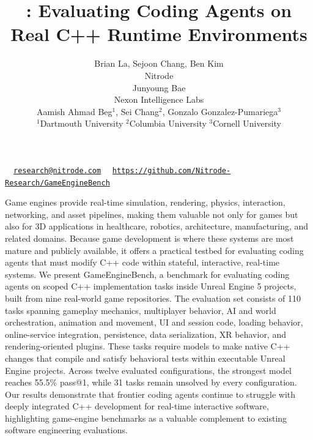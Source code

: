 \documentclass[11pt]{article}
\title{\benchmarkname: Evaluating Coding Agents on Real C++ Runtime Environments}
\author{
  Brian La, Sejoon Chang, Ben Kim \\
  {\small Nitrode}\\[1em]
  Junyoung Bae \\
  {\small Nexon Intelligence Labs}\\[1em]
  Aamish Ahmad Beg$^{1}$, Sei Chang$^{2}$, Gonzalo Gonzalez-Pumariega$^{3}$\\
  {\small $^{1}$Dartmouth University $^{2}$Columbia University $^{3}$Cornell University}
}
\date{}
\newcommand{\benchmarkname}{GameEngineBench\xspace}
\renewcommand{\abstractname}{Abstract}
\renewenvironment{abstract}
  {\par\noindent{\Large\bfseries\abstractname}\par\vspace{0.4em}\noindent}
  {\par\vspace{0.6em}}
\begin{document}
\maketitle
\vspace*{-2em}
\renewcommand{\thefootnote}{\fnsymbol{footnote}}
\renewcommand{\thefootnote}{\arabic{footnote}}

\begin{flushleft}
\small
{}~~\href{mailto:research@nitrode.com}{\texttt{research@nitrode.com}}
\hspace{1em}
~~\href{https://github.com/Nitrode-Research/GameEngineBench}{\texttt{https://github.com/Nitrode-Research/GameEngineBench}}
\end{flushleft}

\begin{abstract}Game engines provide real-time simulation, rendering, physics, interaction, networking, and asset pipelines, making them valuable not only for games but also for 3D applications in healthcare, robotics, architecture, manufacturing, and related domains. Because game development is where these systems are most mature and publicly available, it offers a practical testbed for evaluating coding agents that must modify C++ code within stateful, interactive, real-time systems. We present \benchmarkname, a benchmark for evaluating coding agents on scoped C++ implementation tasks inside Unreal Engine 5 projects, built from nine real-world game repositories. The evaluation set consists of 110 tasks spanning gameplay mechanics, multiplayer behavior, AI and world orchestration, animation and movement, UI and session code, loading behavior, online-service integration, persistence, data serialization, XR behavior, and rendering-oriented plugins. These tasks require models to make native C++ changes that compile and satisfy behavioral tests within executable Unreal Engine projects. Across twelve evaluated configurations, the strongest model reaches 55.5\% pass@1, while 31 tasks remain unsolved by every configuration. Our results demonstrate that frontier coding agents continue to struggle with deeply integrated C++ development for real-time interactive software, highlighting game-engine benchmarks as a valuable complement to existing software engineering evaluations.
\end{abstract}
\end{document}
